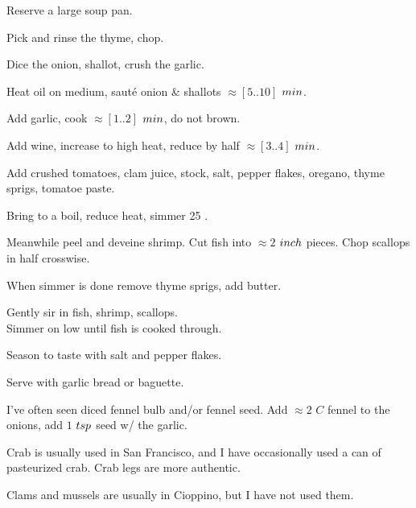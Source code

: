 \begin{preparation}
\item Reserve a large soup pan.

\item Pick and rinse the thyme, chop.

\item Dice the onion, shallot, crush the garlic.

\item Heat oil on medium, saut\'{e} onion \& shallots $\approx[5..10]$ $\minute$.

\item Add garlic, cook $\approx[1..2]$ $\minute$, do not brown.

\item Add wine, increase to high heat, reduce by half $\approx[3..4]$ $\minute$.

\item Add crushed tomatoes, clam juice, stock, salt, pepper flakes, oregano, thyme sprigs, tomatoe paste.

\item Bring to a boil, reduce heat, simmer 25 \minute.

\item Meanwhile peel and deveine shrimp.
	Cut fish into $\approx2$ $\inch$ pieces.
	Chop scallops in half crosswise.

\item When simmer is done remove thyme sprigs, add butter.

\item Gently sir in fish, shrimp, scallops.\\
	Simmer on low until fish is cooked through.

\item Season to taste with salt and pepper flakes.

\item Serve with garlic bread or baguette.
\end{preparation}


\begin{variation}
\item I've often seen diced fennel bulb and/or fennel seed.
	Add $\approx2$ $C$ fennel to the onions, add $1$ $\teaspoon$ seed w/ the garlic.

\item Crab is usually used in San Francisco, and I have occasionally used a can of pasteurized crab. Crab legs are more authentic.

\item Clams and mussels are usually in Cioppino, but I have not used them.
\end{variation}

\recipeend%
